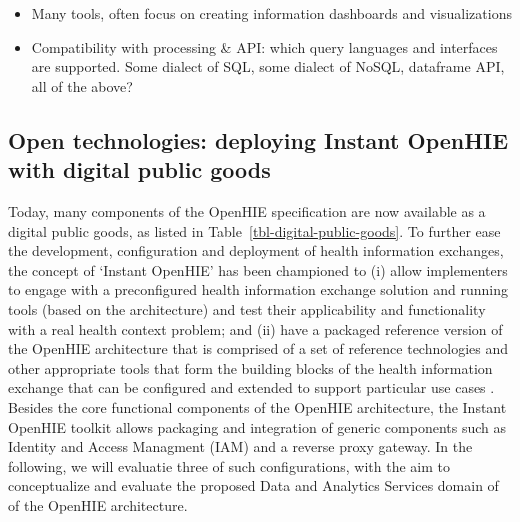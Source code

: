 \documentclass[
  authoryear]{elsarticle}
\providecommand{\tightlist}{%
  \setlength{\itemsep}{0pt}\setlength{\parskip}{0pt}}\usepackage{longtable,booktabs,array}
\begin{document}
\begin{itemize}
\tightlist
\item
  Many tools, often focus on creating information dashboards and
  visualizations
\item
  Compatibility with processing \& API: which query languages and
  interfaces are supported. Some dialect of SQL, some dialect of NoSQL,
  dataframe API, all of the above?
\end{itemize}

\subsection{Open technologies: deploying Instant OpenHIE with digital
public
goods}\label{open-technologies-deploying-instant-openhie-with-digital-public-goods}

Today, many components of the OpenHIE specification are now available as
a digital public goods, as listed in
Table~\ref{tbl-digital-public-goods}. To further ease the development,
configuration and deployment of health information exchanges, the
concept of `Instant OpenHIE' has been championed to (i) allow
implementers to engage with a preconfigured health information exchange
solution and running tools (based on the architecture) and test their
applicability and functionality with a real health context problem; and
(ii) have a packaged reference version of the OpenHIE architecture that
is comprised of a set of reference technologies and other appropriate
tools that form the building blocks of the health information exchange
that can be configured and extended to support particular use cases
\citep{InstantOpenHIEv2}. Besides the core functional components of the
OpenHIE architecture, the Instant OpenHIE toolkit allows packaging and
integration of generic components such as Identity and Access Managment
(IAM) and a reverse proxy gateway. In the following, we will evaluatie
three of such configurations, with the aim to conceptualize and evaluate
the proposed Data and Analytics Services domain of of the OpenHIE
architecture.
\end{document}
